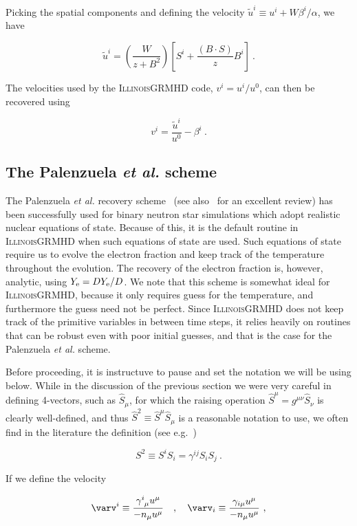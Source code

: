 \documentclass{article}
\newcommand{\igm}{\textsc{IllinoisGRMHD}\xspace}
\newcommand{\ye}{Y_{\rm e}}
\newcommand{\etal}{\textit{et al.}\xspace}
\newcommand{\BdotS}{B\cdot S}
\newcommand{\eq}[1]{
\begin{equation}
    #1
\end{equation}
}
\begin{document}
\noindent Picking the spatial components and defining the velocity $\tilde{u}^{i} \equiv u^{i} + W\beta^{i}/\alpha$, we have

\eq{
\boxed{\tilde{u}^{i} = \left(\frac{W}{z+B^{2}}\right)\left[S^{i}+\frac{\left(\BdotS\right)}{z}B^{i}\right]}\ .\label{eq:C2P_velocities}
}

\noindent The velocities used by the \igm code, $v^{i} = u^{i}/u^{0}$, can then be recovered using

\eq{
  v^{i} = \frac{\tilde{u}^{i}}{u^{0}} - \beta^{i}\ .
}

\subsection{The Palenzuela \etal scheme}

The Palenzuela \etal recovery scheme~\cite{neilsen2014magnetized} (see also~\cite{siegel2018recovery} for an excellent review) has been successfully used for binary neutron star simulations which adopt realistic nuclear equations of state. Because of this, it is the default routine in \igm when such equations of state are used. Such equations of state require us to evolve the electron fraction and keep track of the temperature throughout the evolution. The recovery of the electron fraction is, however, analytic, using $\ye = D\ye/D$. We note that this scheme is somewhat ideal for \igm, because it only requires guess for the temperature, and furthermore the guess need not be perfect. Since \igm does not keep track of the primitive variables in between time steps, it relies heavily on routines that can be robust even with poor initial guesses, and that is the case for the Palenzuela \etal scheme.

Before proceeding, it is instructuve to pause and set the notation we will be using below. While in the discussion of the previous section we were very careful in defining 4-vectors, such as $\hat{S}_{\mu}$, for which the raising operation $\hat{S}^{\mu} = g^{\mu\nu}\hat{S}_{\nu}$ is clearly well-defined, and thus $\hat{S}^{2} \equiv \hat{S}^{\mu}\hat{S}_{\mu}$ is a reasonable notation to use, we often find in the literature the definition (see e.g.~\cite{neilsen2014magnetized,siegel2018recovery,giacomazzo2007whiskymhd,cerda2008new,anton2006numerical})

\eq{
S^{2} \equiv S^{i}S_{i} = \gamma^{ij}S_{i}S_{j}\ .
}

\noindent If we define the velocity

\eq{
  \varv^{i} \equiv \frac{\gamma^{i}_{\ \mu}u^{\mu}}{-n_{\mu}u^{\mu}}\quad ,\quad \varv_{i} \equiv \frac{\gamma_{i\mu}u^{\mu}}{-n_{\mu}u^{\mu}}\ ,
}
\end{document}
